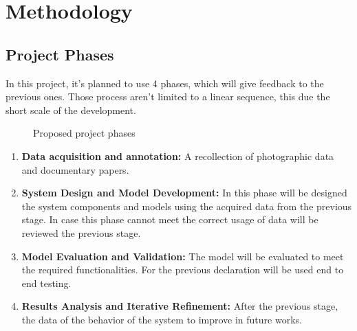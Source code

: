 \documentclass[11pt]{article}
\begin{document}
\section{Methodology}

\subsection{Project Phases}
In this project, it's planned to use 4 phases, which will give feedback to the previous ones. Those process aren't limited to a linear sequence, this due the short scale of the development.

\begin{figure}[h!]
    \centering
    \caption{Proposed project phases}
    \label{fig:placeholder}
\end{figure}

\begin{enumerate}
    \item \textbf{Data acquisition and annotation:} A recollection of photographic data and documentary papers.
    \item \textbf{System Design and Model Development:} In this phase will be designed the system components and models using the acquired data from the previous stage. In case this phase cannot meet the correct usage of data will be reviewed the previous stage.
    \item \textbf{Model Evaluation and Validation:} The model will be evaluated to meet the required functionalities. For the previous declaration will be used end to end testing.
    \item \textbf{Results Analysis and Iterative Refinement:} After the previous stage, the data of the behavior of the system to improve in future works.
\end{enumerate}
\end{document}
